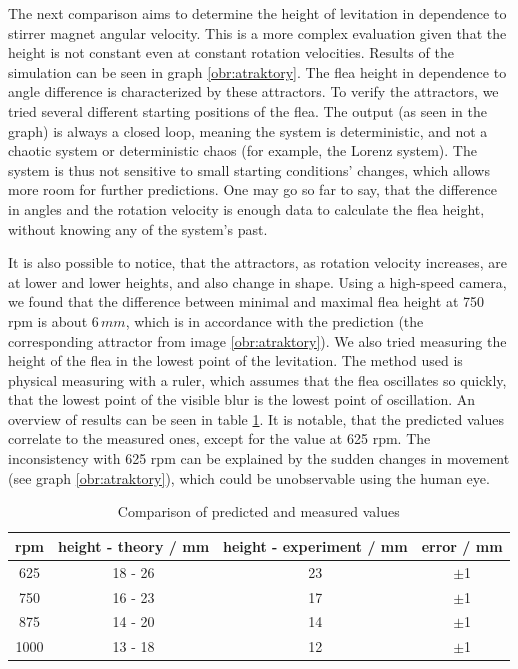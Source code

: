 \documentclass[10pt,a4paper]{article}
\begin{document}
The next comparison aims to determine the height of levitation in dependence to stirrer magnet angular velocity. This is a more complex evaluation given that the height is not constant even at constant rotation velocities. Results of the simulation can be seen in graph \ref{obr:atraktory}.
The flea height in dependence to angle difference is characterized by these attractors. To verify the attractors, we tried several different starting positions of the flea. The output (as seen in the graph) is always a closed loop, meaning the system is deterministic, and not a chaotic system or deterministic chaos (for example, the Lorenz system). The system is thus not sensitive to small starting conditions' changes, which allows more room for further predictions. One may go so far to say, that the difference in angles and the rotation velocity is enough data to calculate the flea height, without knowing any of the system's past.\par It is also possible to notice, that the attractors, as rotation velocity increases, are at lower and lower heights, and also change in shape. Using a high-speed camera, we found that the difference between minimal and maximal flea height at 750 rpm is about $6 \, mm$, which is in accordance with the prediction (the corresponding attractor from image \ref{obr:atraktory}). We also tried measuring the height of the flea in the lowest point of the levitation. The method used is physical measuring with a ruler, which assumes that the flea oscillates so quickly, that the lowest point of the visible blur is the lowest point of oscillation. An overview of results can be seen in table \ref{tab:vysky}. It is notable, that the predicted values correlate to the measured ones, except for the value at 625 rpm. The inconsistency with 625 rpm can be explained by the sudden changes in movement (see graph \ref{obr:atraktory}), which could be unobservable using the human eye.

\begin{table}
\centering
\begin{tabular}{|c|c|c|c|}
\hline
rpm & height - theory / mm & height - experiment / mm & error / mm \\
\hline
625 & 18 - 26 & 23 & $\pm$1 \\
\hline
750 & 16 - 23 & 17 & $\pm$1 \\
\hline
875 & 14 - 20 & 14 & $\pm$1 \\
\hline
1000 & 13 - 18 & 12 & $\pm$1 \\
\hline
\end{tabular}
\caption{Comparison of predicted and measured values}
\label{tab:vysky}
\end{table}
\end{document}
